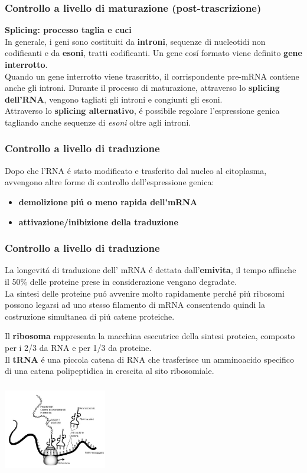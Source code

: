\documentclass[hyperref={pdfpagelabels=false}]{beamer}
\begin{document}
\begin{frame}\frametitle{Controllo a livello di maturazione (post-trascrizione)}
\textbf{Splicing: processo taglia e cuci}\\
In generale, i geni sono costituiti da \textbf{introni}, sequenze di nucleotidi non codificanti e da \textbf{esoni}, tratti codificanti. Un gene cos\'i formato viene definito \textbf{gene interrotto}.\\
Quando un gene interrotto viene trascritto, il corrispondente pre-mRNA contiene anche gli introni. Durante il processo di maturazione, attraverso lo \textbf{splicing dell'RNA}, vengono tagliati gli introni e congiunti gli esoni.\\
Attraverso lo \textbf{splicing alternativo}, \'e possibile regolare l'espressione genica tagliando anche sequenze di \emph{esoni} oltre agli introni.
\end{frame}

\begin{frame}\frametitle{Controllo a livello di traduzione}
Dopo che l'RNA \'e stato modificato e trasferito dal nucleo al citoplasma, avvengono altre forme di controllo dell'espressione genica:\\

\begin{itemize}
\item \textbf{demolizione pi\'u o meno rapida dell'mRNA}
\item \textbf{attivazione/inibizione della traduzione}
\end{itemize}
\end{frame}

\begin{frame}\frametitle{Controllo a livello di traduzione}
La longevit\'a di traduzione dell' mRNA \'e dettata dall'\textbf{emivita}, il tempo affinche il 50\% delle proteine prese in considerazione vengano degradate.\\
La sintesi delle proteine pu\'o avvenire molto rapidamente perch\'e pi\'u ribosomi possono legarsi ad uno stesso filamento di mRNA consentendo quindi la costruzione simultanea di pi\'u catene proteiche.
\begin{minipage}[c]{.5\textwidth}
Il \textbf{ribosoma} rappresenta la macchina esecutrice della sintesi proteica, composto per i 2/3 da RNA e per 1/3 da proteine.\\
Il \textbf{tRNA} \'e una piccola catena di RNA che trasferisce un amminoacido specifico di una catena polipeptidica in crescita al sito ribosomiale.
\end{minipage}
\begin{minipage}[c]{.45\textwidth}
\includegraphics[width=4.5cm,height=4cm]{traduzione.jpg}
\end{minipage}
\end{frame}
\end{document}
